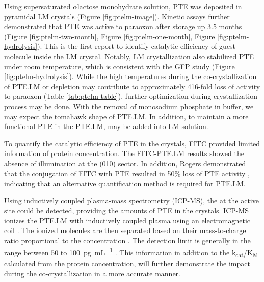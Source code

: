 \begin{refsection}
Using supersaturated $\alpha$lactose monohydrate solution, PTE was deposited in
pyramidal LM crystals (Figure \ref{fig:ptelm-image}). Kinetic assays further
demonstrated that PTE was active to paraoxon after storage up 3.5 months
(Figure \ref{fig:ptelm-two-month}, Figure \ref{fig:ptelm-one-month}, Figure
\ref{fig:ptelm-hydrolysis}). This is the first report to identify catalytic
efficiency of guest molecule inside the LM crystal. Notably, LM crystallization
also stabilized PTE under room temperature, which is consistent with the GFP study
(Figure \ref{fig:ptelm-hydrolysis}). While the high temperatures during the
co-crystallization of PTE.LM or  depletion may contribute to
approximately 416-fold loss of activity to paraoxon (Table
\ref{tab:ptelm-table}), further optimization during crystallization process may
be done. With the removal of monosodium phosphate in buffer, we may expect the
tomahawk shape of PTE.LM. In addition, to maintain a more functional PTE in the
PTE.LM,  may be added into LM solution. 

To quantify the catalytic efficiency of
PTE in the crystals, FITC provided limited information of protein
concentration. The FITC-PTE.LM results showed the absence of illumination at
the (010) sector. In addition, Rogers  demonstrated that the
conjugation of FITC with PTE resulted in 50\% loss of PTE activity
\cite{Rogers1999}, indicating that an alternative quantification method is required
for PTE.LM.

Using inductively coupled plasma-mass spectrometry
(ICP-MS), the  at the active site could be detected, providing the
amounts of PTE in the crystals. ICP-MS ionizes the PTE.LM with inductively
coupled plasma using an electromagnetic coil \cite{Garbarino1996}. The ionized
molecules are then separated based on their mass-to-charge ratio proportional
to the concentration \cite{Garbarino1996}. The detection limit is generally in
the range between 50 to \SI{100}{\pico\gram\per\mL} \cite{Garbarino1996}. This
information in addition to the k\textsubscript{cat}/K\textsubscript{M}
calculated from the protein concentration, will further demonstrate the impact
during the co-crystallization in a more accurate manner.


\printbibliography[heading=subbibliography]

\end{refsection}
